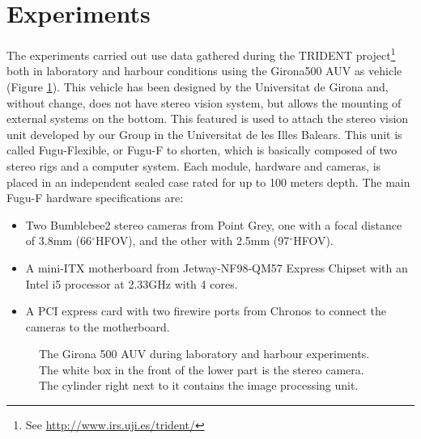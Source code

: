 \documentclass[conference]{IEEEtran}
\newcommand{\degree}{\ensuremath{^\circ}}
\begin{document}
\section{Experiments
  \label{experiments}
}

The experiments carried out use data gathered during the TRIDENT project\footnote{See \url{http://www.irs.uji.es/trident/}} both in laboratory and harbour conditions using the Girona500 AUV \cite{Ribas2012} as vehicle (Figure \ref{g500}). This vehicle has been designed by the Universitat de Girona and, without change, does not have stereo vision system, but allows the mounting of external systems on the bottom. This featured is used to attach the stereo vision unit developed by our Group in the Universitat de les Illes Balears. This unit is called Fugu-Flexible, or Fugu-F to shorten, which is basically composed of two stereo rigs and a computer system. Each module, hardware and cameras, is placed in an independent sealed case rated for up to 100 meters depth. The main Fugu-F hardware specifications are:

\begin{itemize}
  \item Two Bumblebee2 stereo cameras from Point Grey, one with a focal distance of 3.8mm (66\degree HFOV), and the other with 2.5mm (97\degree HFOV).
  \item A mini-ITX motherboard from Jetway-NF98-QM57 Express Chipset with an Intel i5 processor at 2.33GHz with 4 cores.
  \item A PCI express card with two firewire ports from Chronos to connect the cameras to the motherboard.
\end{itemize}

\begin{figure}
  \noindent{}
  \caption{The Girona 500 AUV during laboratory and harbour experiments. The white box in the front of the lower part is the stereo camera. The cylinder right next to it contains the image processing unit.}
  \label{g500}
\end{figure}
\end{document}
